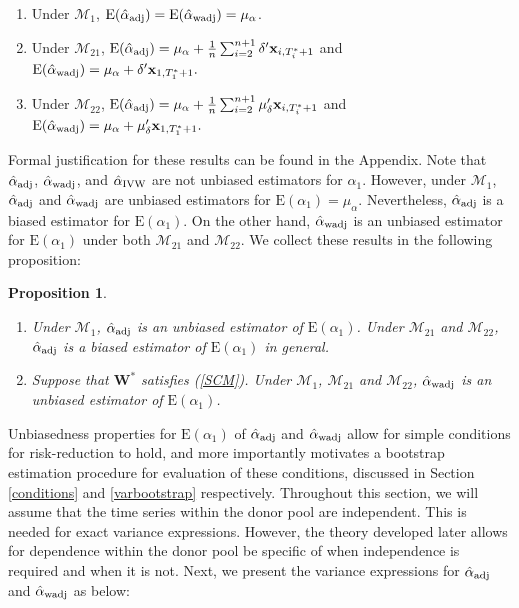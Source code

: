 \documentclass[11pt,3p,review,authoryear]{elsarticle}
\def\mbf#1{\mathbf{#1}} %
\def\mc#1{\mathcal{#1}} %
\def\E#1{\mathrm{E}(#1)} %
\newcommand\red[1]{{\color{red}#1}}
\newtheorem{prop}{Proposition}
\theoremstyle{definition}
\begin{document}
 \begin{enumerate}[label = (\roman*)]
    \item Under $\mc{M}_{1}$, $\E{\hat{\alpha}_{\rm adj}}=\E{\hat{\alpha}_{\rm wadj}} = \mu_{\alpha}$.
    \item Under $\mc{M}_{21}$, 
    $
      \E{\hat{\alpha}_{\rm adj}} = \mu_{\alpha} + \frac{1}{n} \sum_{i=2}^{n+1} \delta' \mbf{x}_{i, T_i^*+1}
    $
    and
    $
       \E{\hat{\alpha}_{\rm wadj}} = \mu_{\alpha} + \delta'\mbf{x}_{1, T_1^*+1} .
    $
    \item Under $\mc{M}_{22}$,
    $
      \E{\hat{\alpha}_{\rm adj}} = \mu_{\alpha} + \frac{1}{n} \sum_{i=2}^{n+1} \mu_{\delta}' \mbf{x}_{i, T_i^*+1}
    $
    and
    $
       \E{\hat{\alpha}_{\rm wadj}} = \mu_{\alpha} + \mu_{\delta}'\mbf{x}_{1, T_1^*+1} .
    $
  \end{enumerate}
Formal justification for these results can be found in the Appendix. Note that $\hat{\alpha}_{\rm adj}$, $\hat{\alpha}_{\rm wadj}$, and $\hat{\alpha}_{\rm IVW}$ are not unbiased estimators for $\alpha_1$. However, under $\mc{M}_{1}$, $\hat{\alpha}_{\rm adj}$ and $\hat{\alpha}_{\rm wadj}$ are unbiased estimators for $\E{\alpha_1}=\mu_{\alpha}$. Nevertheless, $\hat{\alpha}_{\rm adj}$ is a biased estimator for $\E{\alpha_1}$. On the other hand, $\hat{\alpha}_{\rm wadj}$ is an unbiased estimator for $\E{\alpha_1}$ under both $\mc{M}_{21}$ and $\mc{M}_{22}$. We collect these results in the following proposition: 

\begin{prop}
\label{unbiased} 
\quad 
\begin{enumerate}[label = (\roman*)]
  \item Under $\mc{M}_1$, $\hat{\alpha}_{\rm adj}$ is an unbiased estimator of $\E{\alpha_1}$. Under $\mc{M}_{21}$ and $\mc{M}_{22}$, $\hat{\alpha}_{\rm adj}$ is a biased estimator of $\E{\alpha_1}$ in general.
  \item Suppose that $\mbf{W}^*$ satisfies (\ref{SCM}). Under $\mc{M}_{1}$, $\mc{M}_{21}$ and $\mc{M}_{22}$, $\hat{\alpha}_{\rm wadj}$ is an unbiased estimator of $\E{\alpha_1}$.
\end{enumerate}
\end{prop}


Unbiasedness properties for $\E{\alpha_1}$ of $\hat{\alpha}_{\rm adj}$ and $\hat{\alpha}_{\rm wadj}$ allow for simple conditions for risk-reduction to hold, and more importantly motivates a bootstrap estimation procedure for evaluation of these conditions, discussed in Section \ref{conditions} and \ref{varbootstrap} respectively. Throughout this section, we will assume that the time series within the donor pool are independent. This is needed for exact variance expressions. However, the theory developed later allows for dependence within the donor pool \red{be specific of when independence is required and when it is not}. Next, we present the variance expressions for $\hat{\alpha}_{\rm adj}$ and $\hat{\alpha}_{\rm wadj}$ as below: 
\end{document}
